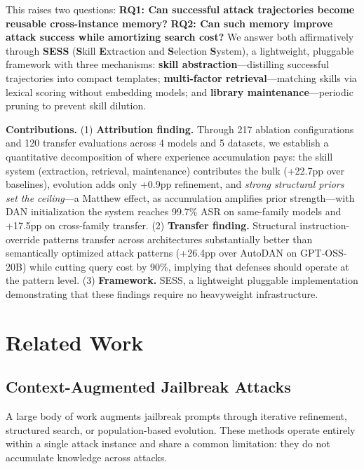 \documentclass{article} %
\begin{document}
This raises two questions: \textbf{RQ1: Can successful attack trajectories become reusable cross-instance memory?} \textbf{RQ2: Can such memory improve attack success while amortizing search cost?} We answer both affirmatively through \textbf{SESS} (\textbf{S}kill \textbf{E}xtraction and \textbf{S}election \textbf{S}ystem), a lightweight, pluggable framework with three mechanisms: \textbf{skill abstraction}---distilling successful trajectories into compact templates; \textbf{multi-factor retrieval}---matching skills via lexical scoring without embedding models; and \textbf{library maintenance}---periodic pruning to prevent skill dilution.

\textbf{Contributions.} (1) \textbf{Attribution finding.} Through 217 ablation configurations and 120 transfer evaluations across 4 models and 5 datasets, we establish a quantitative decomposition of where experience accumulation pays: the skill system (extraction, retrieval, maintenance) contributes the bulk (+22.7pp over baselines), evolution adds only +0.9pp refinement, and \emph{strong structural priors set the ceiling}---a Matthew effect, as accumulation amplifies prior strength---with DAN initialization the system reaches 99.7\% ASR on same-family models and +17.5pp on cross-family transfer. (2) \textbf{Transfer finding.} Structural instruction-override patterns transfer across architectures substantially better than semantically optimized attack patterns (+26.4pp over AutoDAN on GPT-OSS-20B) while cutting query cost by 90\%, implying that defenses should operate at the pattern level. (3) \textbf{Framework.} SESS, a lightweight pluggable implementation demonstrating that these findings require no heavyweight infrastructure.

\section{Related Work}

\subsection{Context-Augmented Jailbreak Attacks}

A large body of work augments jailbreak prompts through iterative refinement, structured search, or population-based evolution. These methods operate entirely within a single attack instance and share a common limitation: they do not accumulate knowledge across attacks.
\end{document}
